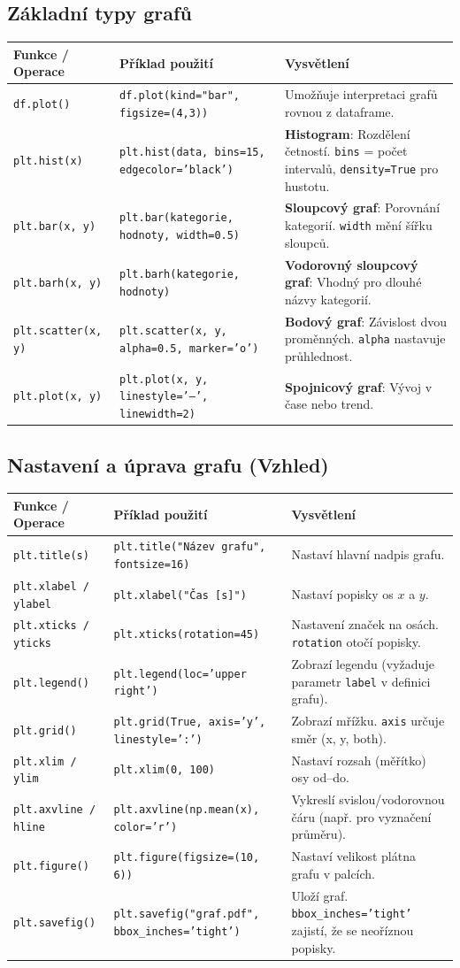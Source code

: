 \documentclass[a4paper, 11pt]{article}
\newenvironment{funkcedict}
{
\renewcommand{\arraystretch}{1.4}
\begin{tabular}{p{0.30\textwidth} p{0.32\textwidth} p{0.33\textwidth}}
\toprule
\textbf{Funkce / Operace} & \textbf{Příklad použití} & \textbf{Vysvětlení} \\
\midrule
}
{
\bottomrule
\end{tabular}
}
\begin{document}
\subsection*{Základní typy grafů}
\begin{funkcedict}
\texttt{df.plot()} & \texttt{df.plot(kind="bar", figsize=(4,3))} & Umožňuje interpretaci grafů rovnou z dataframe. \\
\texttt{plt.hist(x)} & \texttt{plt.hist(data, bins=15, edgecolor='black')} & \textbf{Histogram}: Rozdělení četností. \texttt{bins} = počet intervalů, \texttt{density=True} pro hustotu. \\
\texttt{plt.bar(x, y)} & \texttt{plt.bar(kategorie, hodnoty, width=0.5)} & \textbf{Sloupcový graf}: Porovnání kategorií. \texttt{width} mění šířku sloupců. \\
\texttt{plt.barh(x, y)} & \texttt{plt.barh(kategorie, hodnoty)} & \textbf{Vodorovný sloupcový graf}: Vhodný pro dlouhé názvy kategorií. \\
\texttt{plt.scatter(x, y)} & \texttt{plt.scatter(x, y, alpha=0.5, marker='o')} & \textbf{Bodový graf}: Závislost dvou proměnných. \texttt{alpha} nastavuje průhlednost. \\
\texttt{plt.plot(x, y)} & \texttt{plt.plot(x, y, linestyle='--', linewidth=2)} & \textbf{Spojnicový graf}: Vývoj v čase nebo trend. \\
\end{funkcedict}

\subsection*{Nastavení a úprava grafu (Vzhled)}
\begin{funkcedict}
\texttt{plt.title(s)} & \texttt{plt.title("Název grafu", fontsize=16)} & Nastaví hlavní nadpis grafu. \\
\texttt{plt.xlabel / ylabel} & \texttt{plt.xlabel("Čas [s]")} & Nastaví popisky os $x$ a $y$. \\
\texttt{plt.xticks / yticks} & \texttt{plt.xticks(rotation=45)} & Nastavení značek na osách. \texttt{rotation} otočí popisky. \\
\texttt{plt.legend()} & \texttt{plt.legend(loc='upper right')} & Zobrazí legendu (vyžaduje parametr \texttt{label} v definici grafu). \\
\texttt{plt.grid()} & \texttt{plt.grid(True, axis='y', linestyle=':')} & Zobrazí mřížku. \texttt{axis} určuje směr (x, y, both). \\
\texttt{plt.xlim / ylim} & \texttt{plt.xlim(0, 100)} & Nastaví rozsah (měřítko) osy od--do. \\
\texttt{plt.axvline / hline} & \texttt{plt.axvline(np.mean(x), color='r')} & Vykreslí svislou/vodorovnou čáru (např. pro vyznačení průměru). \\
\texttt{plt.figure()} & \texttt{plt.figure(figsize=(10, 6))} & Nastaví velikost plátna grafu v palcích. \\
\texttt{plt.savefig()} & \texttt{plt.savefig("graf.pdf", bbox\_inches='tight')} & Uloží graf. \texttt{bbox\_inches='tight'} zajistí, že se neoříznou popisky. \\
\end{funkcedict}
\end{document}
